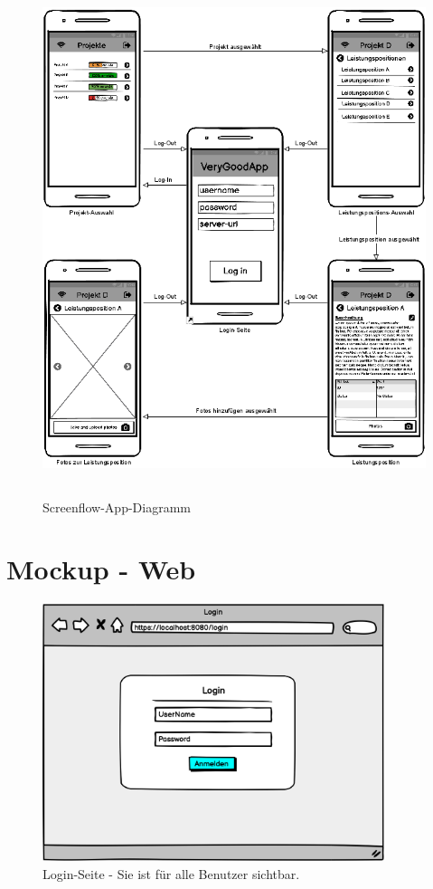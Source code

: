 \begin{figure}[ht]
	\centering
	\includegraphics[width=13cm, height=15cm]{img/mockup-app/Screenflow-App.png}
	\caption{Screenflow-App-Diagramm}
\end{figure}

\clearpage

\section{Mockup - Web}

\begin{figure}[h]
\centering
\includegraphics[width=10cm]{img/mockup_web/login.png}
\caption{Login-Seite - Sie ist für alle Benutzer sichtbar.}
\end{figure}

